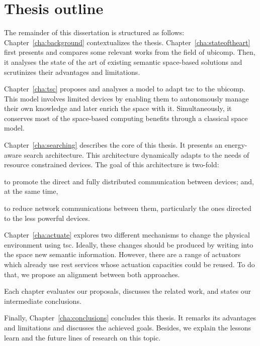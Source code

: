 \section{Thesis outline}
\label{sec:Outline}


The remainder of this dissertation is structured as follows:
Chapter~\ref{cha:background} contextualizes the thesis.
Chapter~\ref{cha:stateoftheart} first presents and compares some relevant works from the field of \acl{ubicomp}. %
Then, it analyses the state of the art of existing semantic space-based solutions and scrutinizes their advantages and limitations.

Chapter~\ref{cha:tsc} proposes and analyses a model to adapt \ac{tsc} to the \ac{ubicomp}.
This model involves limited devices by enabling them to autonomously manage their own knowledge and later enrich the space with it.
Simultaneously, it conserves most of the space-based computing benefits through a classical space model.

Chapter~\ref{cha:searching} describes the core of this thesis.
It presents an energy-aware search architecture.
This architecture dynamically adapts to the needs of resource constrained devices.
The goal of this architecture is two-fold:
\begin{enumerate*}[label=\itshape\alph*\upshape)]
\item to promote the direct and fully distributed communication between devices;
and, at the same time,
\item to reduce network communications between them, particularly the ones directed to the less powerful devices.
\end{enumerate*}

Chapter~\ref{cha:actuate} explores two different mechanisms to change the physical environment using \ac{tsc}.
Ideally, these changes should be produced by writing into the space new semantic information. %
However, there are a range of actuators which already use \ac{rest} services whose actuation capacities could be reused.
To do that, we propose an alignment between both approaches. %


Each chapter evaluates our proposals, discusses the related work, and states our intermediate conclusions. %

Finally, Chapter~\ref{cha:conclusions} concludes this thesis.
It remarks its advantages and limitations and discusses the achieved goals.
Besides, we explain the lessons learn and the future lines of research on this topic. %